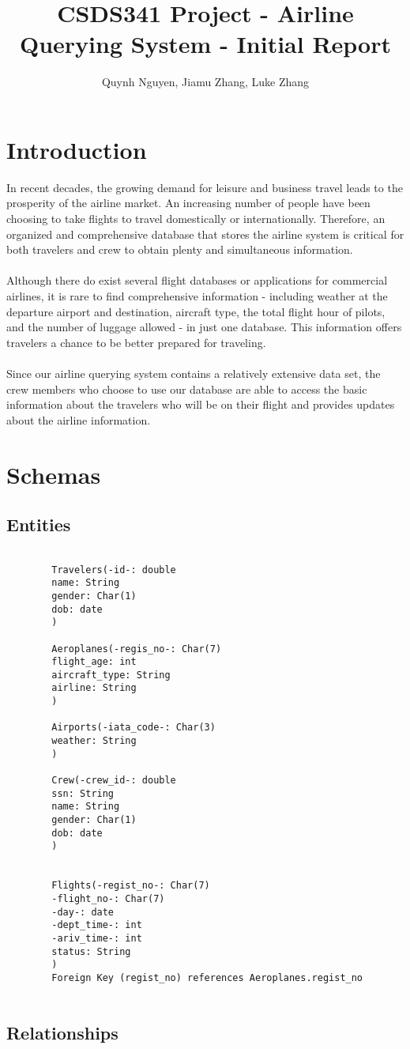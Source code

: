 \documentclass{article}
\title{CSDS341 Project - Airline Querying System - Initial Report}
\author{Quynh Nguyen, Jiamu Zhang, Luke Zhang}
\begin{document}
	
	
	\maketitle
	
	\section{Introduction}
	
	In recent decades, the growing demand for leisure and business travel leads to the prosperity of the airline market. An increasing number of people have been choosing to take flights to travel domestically or internationally. Therefore, an organized and comprehensive database that stores the airline system is critical for both travelers and crew to obtain plenty and simultaneous information.
	\\
	\\
	Although there do exist several flight databases or applications for commercial airlines, it is rare to find comprehensive information - including weather at the departure airport and destination, aircraft type, the total flight hour of pilots, and the number of luggage allowed - in just one database. This information offers travelers a chance to be better prepared for traveling.
	\\
	\\
	Since our airline querying system contains a relatively extensive data set, the crew members who choose to use our database are able to access the basic information about the travelers who will be on their flight and provides updates about the airline information. 
	
	\section{Schemas}
	
	\subsection{Entities}
	\begin{lstlisting}[keepspaces=true]
		
		Travelers(-id-: double
		name: String
		gender: Char(1)
		dob: date
		) 
		
		Aeroplanes(-regis_no-: Char(7)
		flight_age: int
		aircraft_type: String
		airline: String
		)
		
		Airports(-iata_code-: Char(3)
		weather: String
		)
		
		Crew(-crew_id-: double
		ssn: String
		name: String
		gender: Char(1)
		dob: date
		)
		
		
		Flights(-regist_no-: Char(7)
		-flight_no-: Char(7)
		-day-: date
		-dept_time-: int
		-ariv_time-: int
		status: String
		)
		Foreign Key (regist_no) references Aeroplanes.regist_no
		
	\end{lstlisting}
	
	\subsection{Relationships}
	
	
\end{document}
